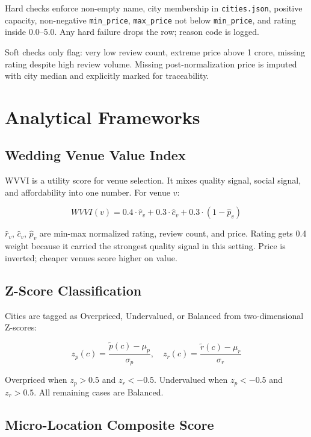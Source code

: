 \documentclass[conference]{IEEEtran}
\begin{document}
Hard checks enforce non-empty name, city membership in \texttt{cities.json}, positive capacity, non-negative \texttt{min\_price}, \texttt{max\_price} not below \texttt{min\_price}, and rating inside 0.0--5.0. Any hard failure drops the row; reason code is logged.

Soft checks only flag: very low review count, extreme price above 1 crore, missing rating despite high review volume. Missing post-normalization price is imputed with city median and explicitly marked for traceability.

\section{Analytical Frameworks}

\subsection{Wedding Venue Value Index}

WVVI is a utility score for venue selection. It mixes quality signal, social signal, and affordability into one number. For venue $v$:

\begin{equation}
WVVI(v) = 0.4 \cdot \hat{r}_v + 0.3 \cdot \hat{c}_v + 0.3 \cdot (1 - \hat{p}_v) \label{eq:wvvi}
\end{equation}

$\hat{r}_v$, $\hat{c}_v$, $\hat{p}_v$ are min-max normalized rating, review count, and price. Rating gets 0.4 weight because it carried the strongest quality signal in this setting. Price is inverted; cheaper venues score higher on value.

\subsection{Z-Score Classification}

Cities are tagged as Overpriced, Undervalued, or Balanced from two-dimensional Z-scores:

\begin{equation}
z_p(c) = \frac{\tilde{p}(c) - \mu_p}{\sigma_p}, \quad z_r(c) = \frac{\tilde{r}(c) - \mu_r}{\sigma_r} \label{eq:zscore}
\end{equation}

Overpriced when $z_p > 0.5$ and $z_r < -0.5$. Undervalued when $z_p < -0.5$ and $z_r > 0.5$. All remaining cases are Balanced.

\subsection{Micro-Location Composite Score}
\end{document}
